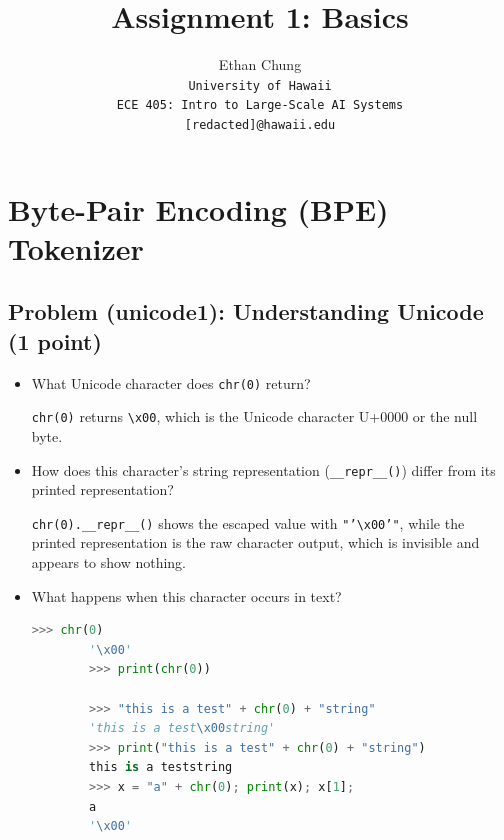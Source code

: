 \documentclass[letterpaper]{article}
\begin{document}
\title{Assignment 1: Basics}

\author{Ethan Chung\\
    {\tt\small University of Hawaii}\\
    {\tt\small ECE 405: Intro to Large-Scale AI Systems}\\
    {\tt\small [redacted]@hawaii.edu}}

\maketitle

\tableofcontents

\newpage

\section{Byte-Pair Encoding (BPE) Tokenizer}

\subsection{Problem (unicode1): Understanding Unicode (1 point)}

\begin{itemize}
	\item[(a)] What Unicode character does \texttt{chr(0)} return?

	\texttt{chr(0)} returns \texttt{\textbackslash x00}, which is the Unicode character U+0000 or the null byte.

	\item[(b)] How does this character's string representation (\texttt{\_\_repr\_\_()}) differ from its printed representation?

	\texttt{chr(0).\_\_repr\_\_()} shows the escaped value with \texttt{"'\textbackslash x00'"}, while the printed representation is the raw character output, which is invisible and appears to show nothing.

	\item[(c)] What happens when this character occurs in text?

	\begin{lstlisting}[language=Python]
		>>> chr(0)
		'\x00'
		>>> print(chr(0))

		>>> "this is a test" + chr(0) + "string"
		'this is a test\x00string'
		>>> print("this is a test" + chr(0) + "string")
		this is a teststring
		>>> x = "a" + chr(0); print(x); x[1];
		a
		'\x00'
	\end{lstlisting}
\end{itemize}
\end{document}
